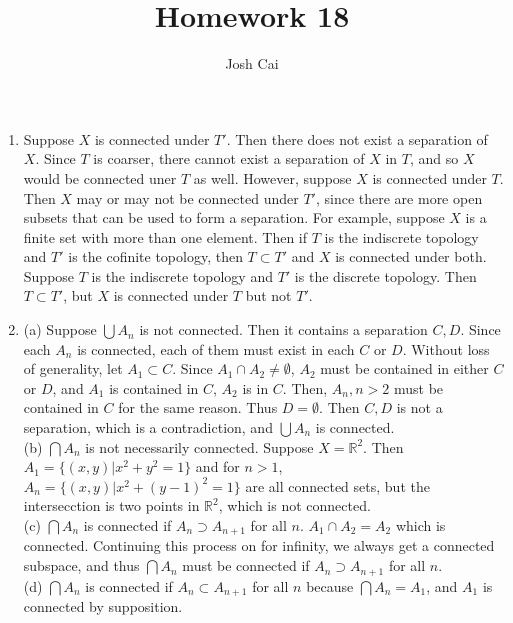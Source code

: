 \documentclass{article}
\begin{document}
\title{Homework 18}
\author{Josh Cai}

\maketitle
\begin{enumerate}
\item
Suppose $X$ is connected under $T'$. Then there does not exist a separation of $X$. Since $T$ is coarser, there cannot exist a separation of $X$ in $T$, and so $X$ would be connected uner $T$ as well. However, suppose $X$ is connected under $T$. Then $X$ may or may not be connected under $T'$, since there are more open subsets that can be used to form a separation. For example, suppose $X$ is a finite set with more than one element. Then if $T$ is the indiscrete topology and $T'$ is the cofinite topology, then $T \subset T'$ and $X$ is connected under both. Suppose $T$ is the indiscrete topology and $T'$ is the discrete topology. Then $T\subset T'$, but $X$ is connected under $T$ but not $T'$.

\item
(a) Suppose $\bigcup A_n$ is not connected. Then it contains a separation $C,D$. Since each $A_n$ is connected, each of them must exist in each $C$ or $D$. Without loss of generality, let $A_1 \subset C$. Since $A_1 \cap A_2 \neq \emptyset$, $A_2$ must be contained in either $C$ or $D$, and $A_1$ is contained in $C$, $A_2$ is in $C$. Then, $A_n, n>2$ must be contained in $C$ for the same reason. Thus $D = \emptyset$. Then $C, D$ is not a separation, which is a contradiction, and $\bigcup A_n$ is connected.
\\(b) $\bigcap A_n$ is not necessarily connected. Suppose $X = \mathbb{R}^2$. Then $A_1 = \{(x,y)|x^2+y^2=1\}$ and for $n>1$, $A_n = \{(x,y)|x^2+(y-1)^2=1\}$ are all connected sets, but the intersecction is two points in $\mathbb{R}^2$, which is not connected.
\\(c) $\bigcap A_n$ is connected if $A_n \supset A_{n+1}$ for all $n$. $A_1 \cap A_2 = A_2$ which is connected. Continuing this process on for infinity, we always get a connected subspace, and thus $\bigcap A_n$ must be connected if $A_n \supset A_{n+1}$ for all $n$.
\\(d) $\bigcap A_n$ is connected if $A_n \subset A_{n+1}$ for all $n$ because $\bigcap A_n = A_1$, and $A_1$ is connected by supposition.


\end{enumerate}
\end{document}
